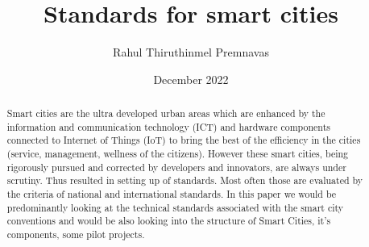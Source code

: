 \documentclass[sigconf]{acmart}
\begin{document}
\title{Standards for smart cities}
\author{Rahul Thiruthinmel Premnavas}
\date{December 2022}






\begin{abstract}
  Smart cities are the ultra developed urban areas which are enhanced by the information and communication technology (ICT) and hardware components connected to Internet of Things (IoT) to bring the best of the efficiency in the cities (service, management, wellness of the citizens). However these smart cities, being rigorously pursued and corrected by developers and innovators, are always under scrutiny. Thus resulted in setting up of standards. Most often those are evaluated by the criteria of national and international standards. In this paper we would be predominantly looking at the technical standards associated with the smart city conventions and would be also looking into the structure of Smart Cities, it's components, some pilot projects.
\end{abstract}

\maketitle
\end{document}
